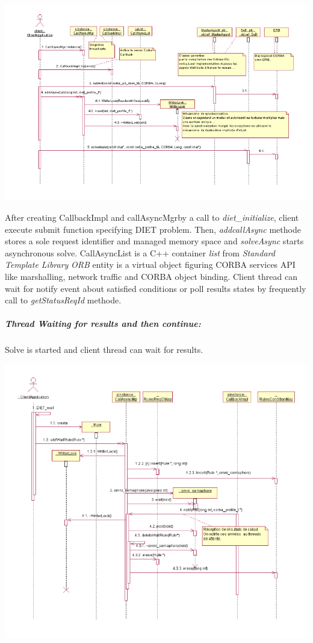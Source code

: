   \hspace{-0.9 in}
  \includegraphics{./fig/CallAsyncSequenceDiagram}

  After creating CallbackImpl and callAsyncMgrby a call to
  \emph{diet\_initialize}, client execute submit function specifying DIET
  problem. Then, \emph{addcallAsync} methode stores a sole request
  identifier and managed memory space and \emph{solveAsync} starts
  asynchronous solve.
  CallAsyncList is a C++ container \emph{list} from \emph{Standard Template Library}
  \emph{ORB} entity is a virtual object figuring CORBA services API like
  marshalling, network traffic and CORBA object binding.
  Client thread can wait for notify event about satisfied conditions or
  poll results states by frequently call to \emph{getStatusReqId} methode.

  \vspace{.9 in}

  \subparagraph{Thread Waiting for results and then continue:}
  Solve is started and client thread can wait for results.

  \hspace{-1 in}
  \includegraphics{./fig/CallAsyncWaitSequenceDiagram}

